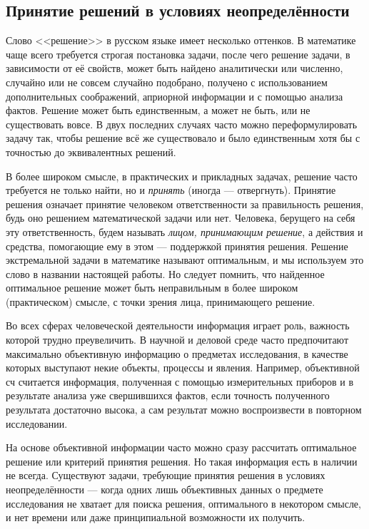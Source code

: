 
\subsection{Принятие решений в условиях неопределённости}
\label{sec:basic_intro}

Слово <<решение>> в русском языке имеет несколько оттенков. В математике чаще всего требуется строгая постановка задачи, после чего решение задачи, в зависимости от её свойств, может быть найдено аналитически или численно, случайно или не совсем случайно подобрано, получено с использованием дополнительных соображений,  априорной информации и с помощью анализа фактов. Решение может быть единственным, а может не быть, или не существовать вовсе. В двух последних случаях часто можно переформулировать задачу так, чтобы решение всё же существовало и было единственным хотя бы с точностью до эквивалентных решений. 

В более широком смысле, в практических и прикладных задачах, решение часто требуется не только найти, но и {\sl принять} (иногда --- отвергнуть). Принятие решения означает принятие человеком ответственности за правильность решения, будь оно решением математической задачи или нет. Человека, берущего на себя эту ответственность, будем называть {\sl лицом, принимающим решение}, а действия и средства, помогающие ему в этом ---  поддержкой принятия решения. Решение экстремальной задачи в математике называют оптимальным, и мы используем это слово в названии настоящей работы. Но следует помнить, что найденное оптимальное решение может быть неправильным в более широком (практическом) смысле, с точки зрения лица, принимающего решение. 

Во всех сферах человеческой деятельности информация играет роль, важность которой трудно преувеличить. В научной и деловой среде часто предпочитают максимально объективную информацию о предметах исследования, в качестве которых выступают некие объекты, процессы и явления. Например, объективной сч считается информация, полученная с помощью измерительных приборов и в результате анализа уже свершившихся фактов, если точность полученного результата достаточно высока, а сам результат можно воспроизвести в повторном исследовании. 

На основе объективной информации часто можно сразу рассчитать оптимальное решение или критерий принятия решения. Но такая информация есть в наличии не всегда. Существуют задачи, требующие принятия решения в условиях неопределённости --- когда одних лишь объективных данных о предмете исследования не хватает для поиска решения, оптимального в некотором смысле, и нет времени или даже принципиальной возможности их  получить. 

